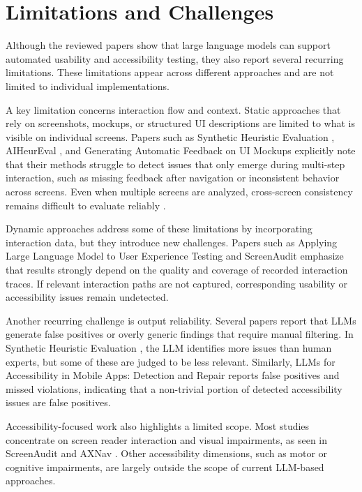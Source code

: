 \documentclass[acmsmall,nonacm]{acmart}
\begin{document}
\section{Limitations and Challenges}

Although the reviewed papers show that large language models can support automated usability and accessibility testing, they also report several recurring limitations. These limitations appear across different approaches and are not limited to individual implementations.

A key limitation concerns interaction flow and context. Static approaches that rely on screenshots, mockups, or structured UI descriptions are limited to what is visible on individual screens. Papers such as Synthetic Heuristic Evaluation \cite{zhong2023synthetic_heuristic}, AIHeurEval \cite{wang2024aiheureval}, and Generating Automatic Feedback on UI Mockups \cite{duan2024ui_mockup_feedback} explicitly note that their methods struggle to detect issues that only emerge during multi-step interaction, such as missing feedback after navigation or inconsistent behavior across screens. Even when multiple screens are analyzed, cross-screen consistency remains difficult to evaluate reliably \cite{wang2024aiheureval}.

Dynamic approaches address some of these limitations by incorporating interaction data, but they introduce new challenges. Papers such as Applying Large Language Model to User Experience Testing \cite{hsueh2023llm_ux_testing} and ScreenAudit \cite{zhong2024screenaudit} emphasize that results strongly depend on the quality and coverage of recorded interaction traces. If relevant interaction paths are not captured, corresponding usability or accessibility issues remain undetected.

Another recurring challenge is output reliability. Several papers report that LLMs generate false positives or overly generic findings that require manual filtering. In Synthetic Heuristic Evaluation \cite{zhong2023synthetic_heuristic}, the LLM identifies more issues than human experts, but some of these are judged to be less relevant. Similarly, LLMs for Accessibility in Mobile Apps: Detection and Repair \cite{aljedaani2024llm_accessibility} reports false positives and missed violations, indicating that a non-trivial portion of detected accessibility issues are false positives.

Accessibility-focused work also highlights a limited scope. Most studies concentrate on screen reader interaction and visual impairments, as seen in ScreenAudit \cite{zhong2024screenaudit} and AXNav \cite{taeb2023axnav}. Other accessibility dimensions, such as motor or cognitive impairments, are largely outside the scope of current LLM-based approaches.
\end{document}
